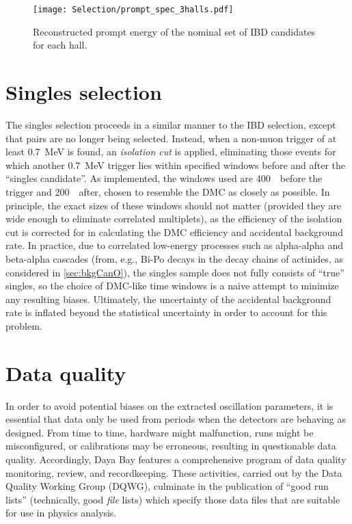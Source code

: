 \documentclass[../thesis.tex]{subfiles}
\begin{document}
\begin{figure}[h]
  \texttt{[image: Selection/prompt\_spec\_3halls.pdf]}
  \caption{Reconstructed prompt energy of the nominal set of IBD candidates for each hall.}
  \label{fig:selPromptSpec}
\end{figure}

\section{Singles selection}
\label{sec:selSingles}

The singles selection proceeds in a similar manner to the IBD selection, except that pairs are no longer being selected. Instead, when a non-muon trigger of at least 0.7~MeV is found, an \emph{isolation cut} is applied, eliminating those events for which another 0.7~MeV trigger lies within specified windows before and after the ``singles candidate''. As implemented, the windows used are 400~\us\ before the trigger and 200~\us\ after, chosen to resemble the DMC as closely as possible. In principle, the exact sizes of these windows should not matter (provided they are wide enough to eliminate correlated multiplets), as the efficiency of the isolation cut is corrected for in calculating the DMC efficiency and accidental background rate. In practice, due to correlated low-energy processes such as alpha-alpha and beta-alpha cascades (from, e.g., Bi-Po decays in the decay chains of actinides, as considered in \autoref{sec:bkgCanO}), the singles sample does not fully consists of ``true'' singles, so the choice of DMC-like time windows is a naive attempt to minimize any resulting biases. Ultimately, the uncertainty of the accidental background rate is inflated beyond the statistical uncertainty in order to account for this problem.

\section{Data quality}
\label{sec:selDataQuality}

In order to avoid potential biases on the extracted oscillation parameters, it is essential that data only be used from periods when the detectors are behaving as designed. From time to time, hardware might malfunction, runs might be misconfigured, or calibrations may be erroneous, resulting in questionable data quality. Accordingly, Daya Bay features a comprehensive program of data quality monitoring, review, and recordkeeping. These activities, carried out by the Data Quality Working Group (DQWG), culminate in the publication of ``good run lists'' (technically, good \emph{file} lists) which specify those data files that are suitable for use in physics analysis.
\end{document}
